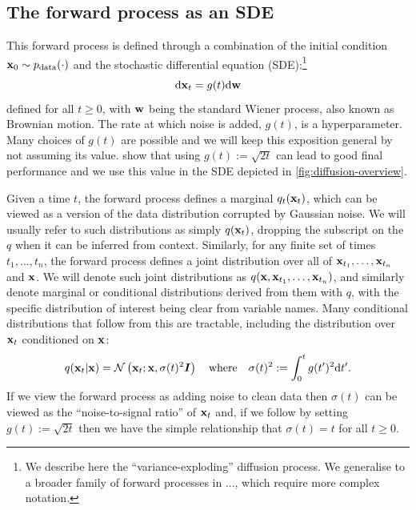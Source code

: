 \subsection{The forward process as an SDE} \label{sec:diffusion-forward-sde}
This forward process is defined through a combination of the initial condition ${\mathbf{x}}_0 \sim p_{\rm{data}}(\cdot)$ and the stochastic differential equation (SDE):\footnote{We describe here the ``variance-exploding'' diffusion process. We generalise to a broader family of forward processes in ..., which require more complex notation.}
\begin{equation} \label{eq:forward-diffusion}
    \mathrm{d}{\mathbf{x}}_t = g(t) \mathrm{d}{\mathbf{w}}
\end{equation}
defined for all $t \geq 0$, with ${\mathbf{w}}$ being the standard Wiener process, also known as Brownian motion. The rate at which noise is added, $g(t)$, is a hyperparameter. Many choices of $g(t)$ are possible and we will keep this exposition general by not assuming its value. \citet{karras2022elucidating} show that using $g(t) := \sqrt{2t}$ can lead to good final performance and we use this value in the SDE depicted in \cref{fig:diffusion-overview}.

Given a time $t$, the forward process defines a marginal $q_t({\mathbf{x}}_t)$, which can be viewed as a version of the data distribution corrupted by Gaussian noise. We will usually refer to such distributions as simply $q({\mathbf{x}}_t)$, dropping the subscript on the $q$ when it can be inferred from context. Similarly, for any finite set of times $t_1,\ldots,t_n$, the forward process defines a joint distribution over all of ${\mathbf{x}}_{t_1},\ldots,{\mathbf{x}}_{t_n}$ and ${\mathbf{x}}$. We will denote such joint distributions as $q({\mathbf{x}},{\mathbf{x}}_{t_1},\ldots,{\mathbf{x}}_{t_n})$, and similarly denote marginal or conditional distributions derived from them with $q$, with the specific distribution of interest being clear from variable names. Many conditional distributions that follow from this are tractable, including the distribution over ${\mathbf{x}}_t$ conditioned on ${\mathbf{x}}$:
\begin{equation}
    q({\mathbf{x}}_t|{\mathbf{x}}) = {\mathcal{N}} \left( {\mathbf{x}}_t; {\mathbf{x}}, \sigma(t)^2 {\bm{I}} \right) \quad \text{where} \quad \sigma(t)^2 := \int_0^t g(t')^2 \mathrm{d}t'.
\end{equation}
If we view the forward process as adding noise to clean data then $\sigma(t)$ can be viewed as the ``noise-to-signal ratio'' of ${\mathbf{x}}_t$ and, if we follow \citet{karras2022elucidating} by setting $g(t) := \sqrt{2t}$ then we have the simple relationship that $\sigma(t) = t$ for all $t\geq0$.

